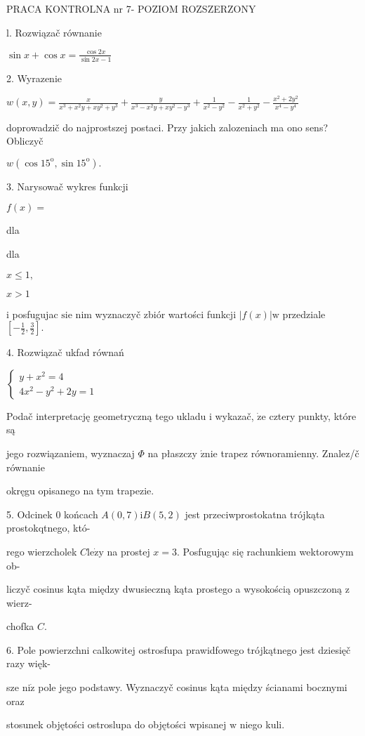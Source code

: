 \documentclass[a4paper,12pt]{article}
\begin{document}
PRACA KONTROLNA nr 7- POZIOM ROZSZERZONY

l. Rozwiązač równanie

$\displaystyle \sin x+\cos x=\frac{\cos 2x}{\sin 2x-1}$

2. Wyrazenie

$w(x,y)=\displaystyle \frac{x}{x^{3}+x^{2}y+xy^{2}+y^{3}}+\frac{y}{x^{3}-x^{2}y+xy^{2}-y^{3}}+\frac{1}{x^{2}-y^{2}}-\frac{1}{x^{2}+y^{2}}-\frac{x^{2}+2y^{2}}{x^{4}-y^{4}}$

doprowadzič do najprostszej postaci. Przy jakich zalozeniach ma ono sens? Obliczyč

$w(\cos 15^{\mathrm{o}},\sin 15^{\mathrm{o}}).$

3. Narysowač wykres funkcji

$f(x)=$

dla

dla

$x\leq 1,$

$x>1$

$\mathrm{i}$ posfugujac $\mathrm{s}\mathrm{i}\mathrm{e}$ nim wyznaczyč zbiór wartości funkcji $|f(x)|\mathrm{w}$ przedziale $[-\displaystyle \frac{1}{2},\frac{3}{2}].$

4. Rozwiązač ukfad równań

$\left\{\begin{array}{l}
y+x^{2}=4\\
4x^{2}-y^{2}+2y=1
\end{array}\right.$

Podač interpretację geometryczną tego ukladu $\mathrm{i}$ wykazač, $\dot{\mathrm{z}}\mathrm{e}$ cztery punkty, które są

jego rozwiązaniem, wyznaczaj $\Phi$ na płaszczy $\acute{\mathrm{z}}\mathrm{n}\mathrm{i}\mathrm{e}$ trapez równoramienny. Znalez/č równanie

okręgu opisanego na tym trapezie.

5. Odcinek $0$ końcach $A(0,7)\mathrm{i}B(5,2)$ jest przeciwprostokatna trójkąta prostokqtnego, któ-

rego wierzcholek $C\mathrm{l}\mathrm{e}\dot{\mathrm{z}}\mathrm{y}$ na prostej $x=3$. Posfugując się rachunkiem wektorowym ob-

liczyč cosinus kąta między dwusieczną kąta prostego a wysokością opuszczoną $\mathrm{z}$ wierz-

chofka $C.$

6. Pole powierzchni calkowitej ostrosfupa prawidfowego trójkątnego jest dziesięč razy więk-

sze $\mathrm{n}\mathrm{i}\dot{\mathrm{z}}$ pole jego podstawy. Wyznaczyč cosinus kąta między ścianami bocznymi oraz

stosunek objętości ostroslupa do objętości wpisanej $\mathrm{w}$ niego kuli.
\end{document}
